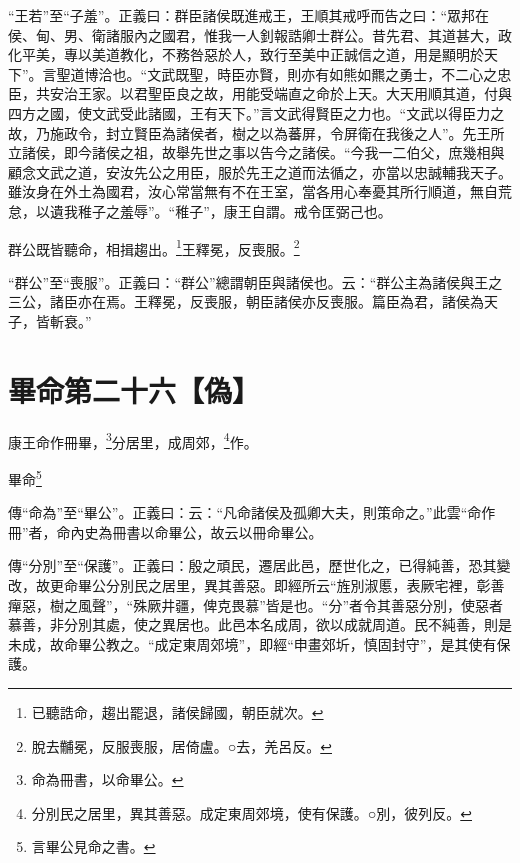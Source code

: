 {\noindent\shu{}\fzkt “王若”至“子羞”。正義曰：群臣諸侯既進戒王，王順其戒呼而告之曰：“眾邦在侯、甸、男、衛諸服內之國君，惟我一人釗報誥卿士群公。昔先君、其道甚大，政化平美，專以美道教化，不務咎惡於人，致行至美中正誠信之道，用是顯明於天下”。言聖道博洽也。“文武既聖，時臣亦賢，則亦有如熊如羆之勇士，不二心之忠臣，共安治王家。以君聖臣良之故，用能受端直之命於上天。大天用順其道，付與四方之國，使文武受此諸國，王有天下。”言文武得賢臣之力也。“文武以得臣力之故，乃施政令，封立賢臣為諸侯者，樹之以為蕃屏，令屏衛在我後之人”。先王所立諸侯，即今諸侯之祖，故舉先世之事以告今之諸侯。“今我一二伯父，庶幾相與顧念文武之道，安汝先公之用臣，服於先王之道而法循之，亦當以忠誠輔我天子。雖汝身在外土為國君，汝心常當無有不在王室，當各用心奉憂其所行順道，無自荒怠，以遺我稚子之羞辱”。“稚子”，康王自謂。戒令匡弼己也。 \par}

群公既皆聽命，相揖趨出。\footnote{已聽誥命，趨出罷退，諸侯歸國，朝臣就次。}王釋冕，反喪服。\footnote{脫去黼冕，反服喪服，居倚盧。○去，羌呂反。}

{\noindent\shu{}\fzkt “群公”至“喪服”。正義曰：“群公”總謂朝臣與諸侯也。云：“群公主為諸侯與王之三公，諸臣亦在焉。王釋冕，反喪服，朝臣諸侯亦反喪服。篇臣為君，諸侯為天子，皆斬衰。” \par}

\section{畢命第二十六【偽】}


康王命作冊畢，\footnote{命為冊書，以命畢公。}分居里，成周郊，\footnote{分別民之居里，異其善惡。成定東周郊境，使有保護。○別，彼列反。}作。

畢命\footnote{言畢公見命之書。}


{\noindent\zhuan{}\fzbyks 傳“命為”至“畢公”。正義曰：云：“凡命諸侯及孤卿大夫，則策命之。”此雲“命作冊”者，命內史為冊書以命畢公，故云以冊命畢公。 \par}

{\noindent\zhuan{}\fzbyks 傳“分別”至“保護”。正義曰：殷之頑民，遷居此邑，歷世化之，已得純善，恐其變改，故更命畢公分別民之居里，異其善惡。即經所云“旌別淑慝，表厥宅裡，彰善癉惡，樹之風聲”，“殊厥井疆，俾克畏慕”皆是也。“分”者令其善惡分別，使惡者慕善，非分別其處，使之異居也。此邑本名成周，欲以成就周道。民不純善，則是未成，故命畢公教之。“成定東周郊境”，即經“申畫郊圻，慎固封守”，是其使有保護。 \par}

